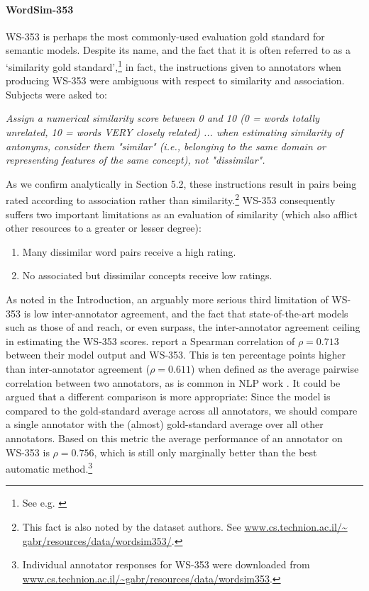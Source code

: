 \documentclass[fullname]{clv2}
\begin{document}
\paragraph{\bf WordSim-353}WS-353 \cite{finkelstein2001placing} is perhaps the most commonly-used evaluation gold standard for semantic models. Despite its name, and the fact that it is often referred to as a `similarity gold standard',\footnote{See e.g. \cite{huang2012improving,bansal2014tailoring}} in fact, the instructions given to annotators when producing WS-353 were ambiguous with respect to similarity and association. Subjects were asked to: \begin{extract} \emph{Assign a numerical similarity score between 0 and 10 (0 = words totally unrelated, 10 = words VERY closely related) ... when estimating similarity of antonyms, consider them "similar" (i.e., belonging to the same domain or representing features of the same concept), not "dissimilar".} \end{extract}

\noindent 

As we confirm analytically in Section 5.2, these instructions result in pairs being rated according to association rather than similarity.\footnote{This fact is also noted by the dataset authors. See \url{www.cs.technion.ac.il/~ gabr/resources/data/wordsim353/}.} WS-353 consequently suffers two important limitations as an evaluation of similarity (which also afflict other resources to a greater or lesser degree):  

\begin{enumerate}

\item Many dissimilar word pairs receive a high rating. 

\item No associated but dissimilar concepts receive low ratings. 

\end{enumerate}

As noted in the Introduction, an arguably more serious third limitation of WS-353 is low inter-annotator agreement, and the fact that state-of-the-art models such as those of  and  reach, or even surpass, the inter-annotator agreement ceiling in estimating the WS-353 scores.  report a Spearman correlation of \(\rho = 0.713\) between their model output and WS-353. This is ten percentage points higher than inter-annotator agreement (\(\rho = 0.611\)) when defined as the average pairwise correlation between two annotators, as is common in NLP work \cite{pado2007flexible,reisinger2010mixture,silberer2014learning}. It could be argued that a different comparison is more appropriate: Since the model is compared to the gold-standard average across all annotators, we should compare a single annotator with the (almost) gold-standard average over all other annotators. Based on this metric the average performance of an annotator on WS-353 is  \( \rho=0.756 \), which is still only marginally better than the best automatic method.\footnote{Individual annotator responses for WS-353 were downloaded from \url{www.cs.technion.ac.il/~gabr/resources/data/wordsim353}.}  
\end{document}
